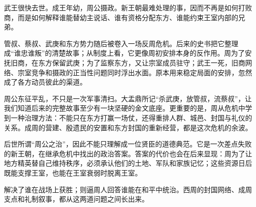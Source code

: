 武王很快去世。成王年幼，周公摄政。新王朝最难处理的事，因而不再是如何打败商，而是如何解释谁能替幼主说话、谁有资格分配东方、谁能约束王室内部的兄弟。

管叔、蔡叔、武庚和东方势力随后被卷入一场反周危机。后来的史书把它整理成“谁忠谁叛”的清楚故事；从制度上看，它更像周初安排本身的反作用。周为了安抚旧商，在东方保留武庚；为了监察东方，又让宗室成员驻守；武王一死，旧商网络、宗室竞争和摄政的正当性问题同时浮出水面。原本用来稳定局面的安排，忽然成了各方动员彼此的渠道。


周公东征平乱，不只是一次军事清扫。大盂鼎所记“杀武庚，放管叔，流蔡叔”，让我们知道后来的完整故事至少有一块坚硬的金文底座。更重要的是，周从危机中学到一种治理方法：不能只在东方打赢一场仗，还得重排人群、城邑、封国与礼仪的关系。成周的营建、殷遗民的安置和东方封国的重新经营，都是这次危机的余波。

后世所谓“周公之治”，因此不能只理解成一位贤臣的道德典范。它是一次差点失败的新王朝，在继承危机中找出的政治答案。答案的代价也会在后来显现：周为了让地方精英替自己维持秩序，必须承认他们的土地、军队和家族记忆；这些资源日后既能支撑王室，也能在王室衰弱时脱离王室。

\begin{causalchain}[从胜利到网络]
解决了谁在战场上获胜；则逼周人回答谁能在和平中统治。西周的封国网络、成周支点和礼制叙事，都从这两道问题之间长出来。
\end{causalchain}
